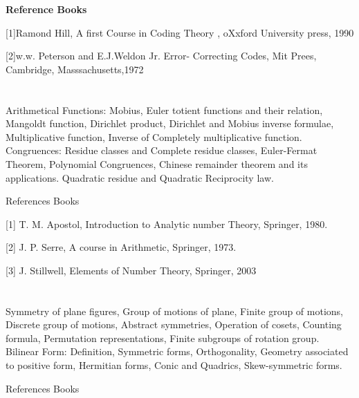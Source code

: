  

 \textbf{Reference Books} 

[1]Ramond Hill, A first Course in Coding Theory , oXxford University press, 1990 

[2]w.w. Peterson and E.J.Weldon Jr. Error- Correcting Codes, Mit Prees, Cambridge, Masssachusetts,1972 

 

\section{\dsccourseinfo}


  

Arithmetical Functions: Mobius, Euler totient functions and their relation, Mangoldt function, Dirichlet product, Dirichlet and Mobius inverse formulae, Multiplicative function, Inverse of Completely multiplicative function. Congruences: Residue classes and Complete residue classes, Euler-Fermat Theorem, Polynomial Congruences, Chinese remainder theorem and its applications. Quadratic residue and Quadratic Reciprocity law.  

 

References Books  

[1] T. M. Apostol, Introduction to Analytic number Theory, Springer, 1980. 

[2] J. P. Serre, A course in Arithmetic, Springer, 1973. 

[3] J. Stillwell, Elements of Number Theory, Springer, 2003 

 
\section{\dsccourseinfo}

 

Symmetry of plane figures, Group of motions of plane, Finite group of motions, Discrete group of motions, Abstract symmetries, Operation of cosets, Counting formula, Permutation representations, Finite subgroups of rotation group. Bilinear Form: Definition, Symmetric forms, Orthogonality, Geometry associated to positive form, Hermitian forms, Conic and Quadrics, Skew-symmetric forms. 

 

References Books  


